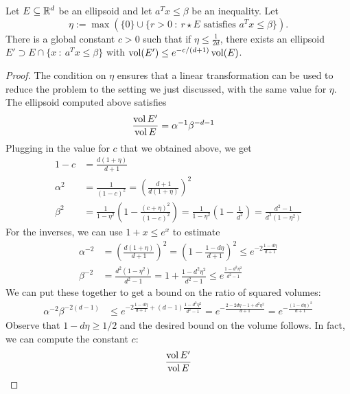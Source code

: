 \begin{lemma}
  \label{lemma:generalized-half-ball}
  Let $E \subseteq \mathbb{R}^d$ be an ellipsoid and let
  $a^Tx \leq \beta$ be an inequality.
  Let
  \[
    \eta := \max(\{ 0 \} \cup \{ r > 0 ~:~ r \star E \text{ satisfies } a^Tx \leq \beta \}).
  \]
  There is a global constant $c > 0$
  such that if $\eta \leq \frac{1}{2d}$,
  there exists an ellipsoid $E' \supset E \cap \{ x ~:~ a^Tx \leq \beta \}$
  with $\operatorname{vol}(E') \leq e^{-c/(d+1)}\operatorname{vol}(E)$.
\end{lemma}
\begin{proof}
  The condition on $\eta$ ensures that a linear transformation can be used to reduce the problem to the setting we just discussed,
  with the same value for $\eta$.
  The ellipsoid computed above satisfies
  \begin{align*}
    \frac{\operatorname{vol} E'}{\operatorname{vol} E}
      &= \alpha^{-1} \beta^{-{d-1}}
  \end{align*}
  Plugging in the value for $c$ that we obtained above, we get
  \begin{align*}
    1 - c &= \frac{d(1 + \eta)}{d + 1} \\
    \alpha^2 &= \frac{1}{(1-c)^2} = \left( \frac{d+1}{d(1+\eta)} \right)^2 \\
    \beta^2 &= \frac{1}{1 - \eta^2} \left( 1 - \frac{(c+\eta)^2}{(1-c)^2} \right) = \frac{1}{1-\eta^2} \left(1 - \frac{1}{d^2} \right) = \frac{d^2 - 1}{d^2(1 - \eta^2)}
  \end{align*}
  For the inverses, we can use $1 + x \leq e^x$ to estimate
  \begin{align*}
    \alpha^{-2} &= \left(\frac{d(1+\eta)}{d+1}\right)^2 = \left(1 - \frac{1 - d\eta}{d+1}\right)^2 \leq e^{-2 \frac{1 - d\eta}{d+1}} \\
    \beta^{-2} &= \frac{d^2(1 - \eta^2)}{d^2 - 1} = 1 + \frac{1 - d^2\eta^2}{d^2-1} \leq e^{\frac{1 - d^2\eta^2}{d^2 - 1}}
  \end{align*}
  We can put these together to get a bound on the ratio of squared volumes:
  \begin{align*}
    \alpha^{-2} \beta^{-2(d-1)}
      &\leq e^{-2 \frac{1-d\eta}{d+1} + (d-1) \frac{1 - d^2\eta^2}{d^2 - 1}}
      = e^{-\frac{2 - 2d\eta - 1 + d^2\eta^2}{d+1}}
      = e^{-\frac{(1 - d\eta)^2}{d+1}}
  \end{align*}
  Observe that $1 - d\eta \geq 1/2$ and the desired bound on the volume follows.
  In fact, we can compute the constant $c$:
  \begin{align*}
    \frac{\vol E'}{\vol E}

\end{align*}
\end{proof}
